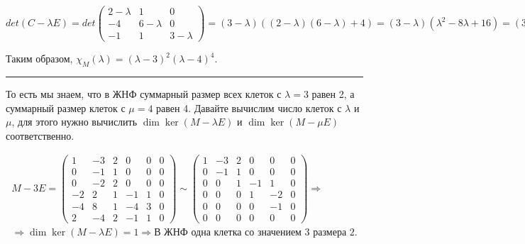 \documentclass[11pt]{article}
\begin{document}
$$
det(C - \lambda E) = det
\begin{pmatrix}
2 - \lambda & 1 & 0 \\
-4 & 6 - \lambda & 0 \\
-1 & 1 & 3 - \lambda
\end{pmatrix} = (3 - \lambda)((2 - \lambda)(6 - \lambda) + 4) = (3 - \lambda)(\lambda^2 - 8\lambda + 16) = (3 - \lambda)(\lambda - 4)^2
$$

Таким образом, $\chi_M(\lambda) = (\lambda - 3)^2(\lambda - 4)^4$.

\noindent\rule{\textwidth}{0.5pt}

То есть мы знаем, что в ЖНФ суммарный размер всех клеток с $\lambda = 3$ равен 2, а суммарный размер клеток с $\mu = 4$ равен 4. Давайте вычислим число клеток с $\lambda$ и $\mu$, для этого нужно вычислить $\dim \ker(M - \lambda E)$ и $\dim \ker(M - \mu E)$ соответственно.

$$
\begin{gathered}
M - 3E =
\begin{pmatrix}
1 & -3 & 2 & 0 & 0 & 0 \\
0 & -1 & 1 & 0 & 0 & 0 \\
0 & -2 & 2 & 0 & 0 & 0 \\
-2 & 2 & 1 & -1 & 1 & 0 \\
-4 & 8 & 1 & -4 & 3 & 0 \\
2 & -4 & 2 & -1 & 1 & 0
\end{pmatrix} \sim
\begin{pmatrix}
1 & -3 & 2 & 0 & 0 & 0 \\
0 & -1 & 1 & 0 & 0 & 0 \\
0 & 0 & 1 & -1 & 1 & 0 \\
0 & 0 & 0 & 1 & -2 & 0 \\
0 & 0 & 0 & 0 & -1 & 0 \\
0 & 0 & 0 & 0 & 0 & 0
\end{pmatrix} \Rightarrow \\[6pt] \Rightarrow \dim \ker(M - \lambda E) = 1 \Rightarrow \text{В ЖНФ одна клетка со значением 3 размера 2}.
\end{gathered}
$$
\end{document}
